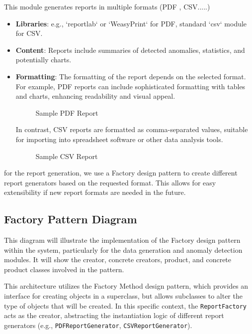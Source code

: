 This module generates reports in multiple formats (PDF , CSV.....)
\begin{itemize}
    \item \textbf{Libraries}: e.g., `reportlab` or `WeasyPrint` for PDF, standard `csv` module for CSV.
    \item \textbf{Content}: Reports include summaries of detected anomalies, statistics, and potentially charts.
    \item \textbf{Formatting}: The formatting of the report depends on the selected format. For example, PDF reports can include sophisticated formatting with tables and charts, enhancing readability and visual appeal. 

\begin{figure}[H]
    \centering
    \caption{Sample PDF Report}
    \label{fig:pdf_report_screenshot}
\end{figure}

In contrast, CSV reports are formatted as comma-separated values, suitable for importing into spreadsheet software or other data analysis tools. 

\begin{figure}[H]
    \centering
    \caption{Sample CSV Report}
    \label{fig:csv_report_screenshot}
\end{figure}
\end{itemize}

for the report generation, we use a Factory design pattern to create different report generators based on the requested format. This allows for easy extensibility if new report formats are needed in the future.
\subsection{Factory Pattern Diagram}
This diagram will illustrate the implementation of the Factory design pattern within the system, particularly for the data generation and anomaly detection modules. It will show the creator, concrete creators, product, and concrete product classes involved in the pattern.

This architecture utilizes the Factory Method design pattern, which provides an interface for creating objects in a superclass, but allows subclasses to alter the type of objects that will be created. In this specific context, the \texttt{ReportFactory} acts as the creator, abstracting the instantiation logic of different report generators (e.g., \texttt{PDFReportGenerator}, \texttt{CSVReportGenerator}).

